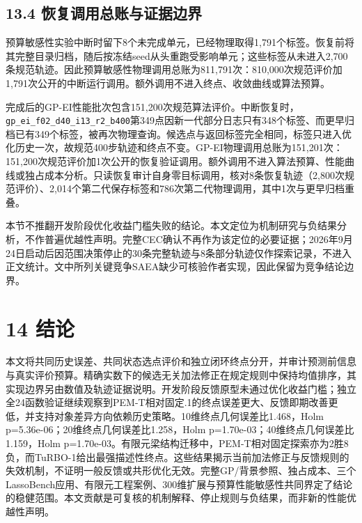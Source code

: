 \documentclass[11pt,a4paper]{article}
\begin{document}
\hypertarget{ux6062ux590dux8c03ux7528ux603bux8d26ux4e0eux8bc1ux636eux8fb9ux754c}{%
\subsection{13.4
恢复调用总账与证据边界}\label{ux6062ux590dux8c03ux7528ux603bux8d26ux4e0eux8bc1ux636eux8fb9ux754c}}

预算敏感性实验中断时留下8个未完成单元，已经物理取得1,791个标签。恢复前将其完整目录归档，随后按冻结seed从头重跑受影响单元；这些标签从未进入2,700条规范轨迹。因此预算敏感性物理调用总账为811,791次：810,000次规范评价加1,791次公开的中断运行调用。额外调用不进入终点、收敛曲线或算法预算。

完成后的GP-EI性能批次包含151,200次规范算法评价。中断恢复时，\texttt{gp\_ei\_f02\_d40\_i13\_r2\_b400}第349点因新一代部分日志只有348个标签、而更早归档已有349个标签，被再次物理查询。候选点与返回标签完全相同，标签只进入优化历史一次，故规范400步轨迹和终点不变。GP-EI物理调用总账为151,201次：151,200次规范评价加1次公开的恢复验证调用。额外调用不进入算法预算、性能曲线或独占成本分析。只读恢复审计自身零目标调用，核对8条恢复轨迹（2,800次规范评价）、2,014个第二代保存标签和786次第二代物理调用，其中1次与更早归档重叠。

本节不推翻开发阶段优化收益门槛失败的结论。本文定位为机制研究与负结果分析，不作普遍优越性声明。完整CEC确认不再作为该定位的必要证据；2026年9月24日启动后因范围决策停止的30条完整轨迹与8条部分轨迹仅作探索记录，不进入正文统计。文中所列关键竞争SAEA缺少可核验作者实现，因此保留为竞争结论边界。

\hypertarget{ux7ed3ux8bba}{%
\section{14 结论}\label{ux7ed3ux8bba}}

本文将共同历史误差、共同状态选点评价和独立闭环终点分开，并审计预测前信息与真实评价预算。精确实数下的候选无关加法修正在规定规则中保持均值排序，其实现边界另由数值及轨迹证据说明。开发阶段反馈原型未通过优化收益门槛；独立全24函数验证继续观察到PEM-T相对固定.1的终点误差更大、反馈即期改善更低，并支持对象差异方向依赖历史策略。10维终点几何误差比1.468，Holm
p=5.36e-06；20维终点几何误差比1.258，Holm
p=1.70e-03；40维终点几何误差比1.159，Holm
p=1.70e-03。有限元梁结构迁移中，PEM-T相对固定探索亦为2胜8负，而TuRBO-1给出最强描述性终点。这些结果揭示当前加法修正与反馈规则的失效机制，不证明一般反馈或共形优化无效。完整GP/背景参照、独占成本、三个LassoBench应用、有限元工程案例、300维扩展与预算性能敏感性共同界定了结论的稳健范围。本文贡献是可复核的机制解释、停止规则与负结果，而非新的性能优越性声明。
\end{document}
